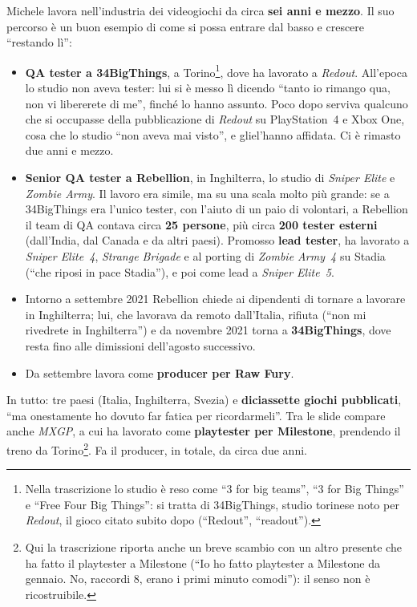 Michele lavora nell'industria dei videogiochi da circa \textbf{sei anni e
mezzo}. Il suo percorso è un buon esempio di come si possa entrare dal basso e
crescere ``restando lì'':
\begin{itemize}
  \item \textbf{QA tester a 34BigThings}, a Torino\footnote{Nella trascrizione
        lo studio è reso come ``3 for big teams'', ``3 for Big Things'' e ``Free
        Four Big Things'': si tratta di 34BigThings, studio torinese noto per
        \emph{Redout}, il gioco citato subito dopo (``Redout'',
        ``readout'').}, dove ha lavorato a \emph{Redout}. All'epoca lo studio
        non aveva tester: lui si è messo lì dicendo ``tanto io rimango qua, non
        vi libererete di me'', finché lo hanno assunto. Poco dopo serviva
        qualcuno che si occupasse della pubblicazione di \emph{Redout} su
        PlayStation~4 e Xbox One, cosa che lo studio ``non aveva mai visto'', e
        gliel'hanno affidata. Ci è rimasto due anni e mezzo.
  \item \textbf{Senior QA tester a Rebellion}, in Inghilterra, lo studio di
        \emph{Sniper Elite} e \emph{Zombie Army}. Il lavoro era simile, ma su
        una scala molto più grande: se a 34BigThings era l'unico tester, con
        l'aiuto di un paio di volontari, a Rebellion il team di QA contava
        circa \textbf{25 persone}, più circa \textbf{200 tester esterni}
        (dall'India, dal Canada e da altri paesi). Promosso \textbf{lead
        tester}, ha lavorato a \emph{Sniper Elite~4}, \emph{Strange Brigade} e
        al porting di \emph{Zombie Army~4} su Stadia (``che riposi in pace
        Stadia''), e poi come lead a \emph{Sniper Elite~5}.
  \item Intorno a settembre 2021 Rebellion chiede ai dipendenti di tornare a
        lavorare in Inghilterra; lui, che lavorava da remoto dall'Italia,
        rifiuta (``non mi rivedrete in Inghilterra'') e da novembre 2021 torna
        a \textbf{34BigThings}, dove resta fino alle dimissioni dell'agosto
        successivo.
  \item Da settembre lavora come \textbf{producer per Raw Fury}.
\end{itemize}
In tutto: tre paesi (Italia, Inghilterra, Svezia) e \textbf{diciassette giochi
pubblicati}, ``ma onestamente ho dovuto far fatica per ricordarmeli''. Tra le
slide compare anche \emph{MXGP}, a cui ha lavorato come
\textbf{playtester per Milestone}, prendendo il treno da Torino\footnote{Qui
la trascrizione riporta anche un breve scambio con un altro presente che ha
fatto il playtester a Milestone (``Io ho fatto playtester a Milestone da
gennaio. No, raccordi 8, erano i primi minuto comodi''): il senso non è
ricostruibile.}. Fa il producer, in totale, da circa due anni.

